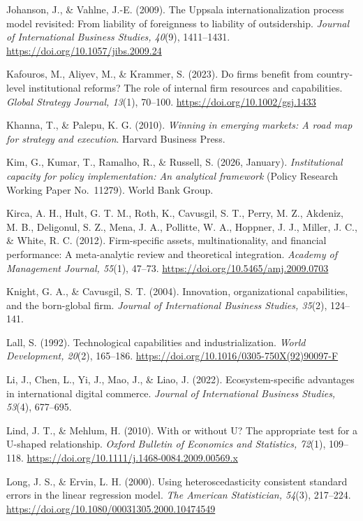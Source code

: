 \documentclass[
  a4paper,
  13pt]{extreport}
\begin{document}
Johanson, J., \& Vahlne, J.-E. (2009). The Uppsala internationalization
process model revisited: From liability of foreignness to liability of
outsidership. \emph{Journal of International Business Studies, 40}(9),
1411--1431. \url{https://doi.org/10.1057/jibs.2009.24}

Kafouros, M., Aliyev, M., \& Krammer, S. (2023). Do firms benefit from
country-level institutional reforms? The role of internal firm resources
and capabilities. \emph{Global Strategy Journal, 13}(1), 70--100.
\url{https://doi.org/10.1002/gsj.1433}

Khanna, T., \& Palepu, K. G. (2010). \emph{Winning in emerging markets:
A road map for strategy and execution}. Harvard Business Press.

Kim, G., Kumar, T., Ramalho, R., \& Russell, S. (2026, January).
\emph{Institutional capacity for policy implementation: An analytical
framework} (Policy Research Working Paper No.~11279). World Bank Group.

Kirca, A. H., Hult, G. T. M., Roth, K., Cavusgil, S. T., Perry, M. Z.,
Akdeniz, M. B., Deligonul, S. Z., Mena, J. A., Pollitte, W. A., Hoppner,
J. J., Miller, J. C., \& White, R. C. (2012). Firm-specific assets,
multinationality, and financial performance: A meta-analytic review and
theoretical integration. \emph{Academy of Management Journal, 55}(1),
47--73. \url{https://doi.org/10.5465/amj.2009.0703}

Knight, G. A., \& Cavusgil, S. T. (2004). Innovation, organizational
capabilities, and the born-global firm. \emph{Journal of International
Business Studies, 35}(2), 124--141.

Lall, S. (1992). Technological capabilities and industrialization.
\emph{World Development, 20}(2), 165--186.
\url{https://doi.org/10.1016/0305-750X(92)90097-F}

Li, J., Chen, L., Yi, J., Mao, J., \& Liao, J. (2022).
Ecosystem-specific advantages in international digital commerce.
\emph{Journal of International Business Studies, 53}(4), 677--695.

Lind, J. T., \& Mehlum, H. (2010). With or without U? The appropriate
test for a U-shaped relationship. \emph{Oxford Bulletin of Economics and
Statistics, 72}(1), 109--118.
\url{https://doi.org/10.1111/j.1468-0084.2009.00569.x}

Long, J. S., \& Ervin, L. H. (2000). Using heteroscedasticity consistent
standard errors in the linear regression model. \emph{The American
Statistician, 54}(3), 217--224.
\url{https://doi.org/10.1080/00031305.2000.10474549}
\end{document}
